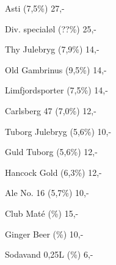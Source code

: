 \documentclass{article}
\begin{document}

\maketitle

\null
\vspace{-0.8cm}


\vspace{0.5cm}

Asti {\large (7,5\%)} \hfill 27,-

\vspace{0.3cm}

Div. specialøl {\large (??\%)}  \hfill 25,-

\vspace{1.3cm}

Thy Julebryg {\large (7,9\%)} \hfill 14,-

\vspace{0.3cm}

Old Gambrinus {\large (9,5\%)}  \hfill 14,-

\vspace{0.3cm}

Limfjordsporter {\large (7,5\%)}  \hfill 14,-

\vspace{0.3cm}

Carlsberg 47 {\large (7,0\%)} \hfill 12,-

\vspace{0.3cm}

Tuborg Julebryg {\large (5,6\%)} \hfill 10,-

\vspace{1.3cm}

Guld Tuborg {\large (5,6\%)} \hfill 12,-

\vspace{0.3cm}

Hancock Gold {\large (6,3\%)} \hfill 12,-

\vspace{0.3cm}

Ale No. 16 {\large (5,7\%)} \hfill 10,-

\vspace{1.3cm}

Club Maté {\large (\frownie{}\%)} \hfill 15,-

\vspace{0.3cm}

Ginger Beer {\large (\frownie{}\%)} \hfill 10,-

\vspace{0.3cm}

Sodavand 0,25L {\large (\frownie{}\%)}  \hfill 6,-

\vspace{0.5cm}

\underskriv
\end{document}
